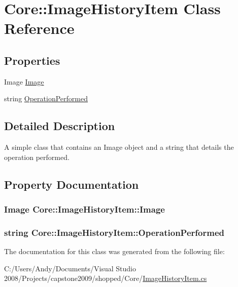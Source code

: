 \hypertarget{class_core_1_1_image_history_item}{
\section{Core::ImageHistoryItem Class Reference}
\label{class_core_1_1_image_history_item}
}
\subsection*{Properties}
\begin{DoxyCompactItemize}
\item 
Image \hyperlink{class_core_1_1_image_history_item_af5221965c5ea168e8ce2b248783daa23}{Image}
\item 
string \hyperlink{class_core_1_1_image_history_item_aa0775d357dd30dafbc2de674b9bcba2b}{OperationPerformed}
\end{DoxyCompactItemize}


\subsection{Detailed Description}
A simple class that contains an Image object and a string that details the operation performed. 

\subsection{Property Documentation}
\hypertarget{class_core_1_1_image_history_item_af5221965c5ea168e8ce2b248783daa23}{
\subsubsection[{Image}]{\setlength{\rightskip}{0pt plus 5cm}Image Core::ImageHistoryItem::Image}}
\label{class_core_1_1_image_history_item_af5221965c5ea168e8ce2b248783daa23}
\hypertarget{class_core_1_1_image_history_item_aa0775d357dd30dafbc2de674b9bcba2b}{
\subsubsection[{OperationPerformed}]{\setlength{\rightskip}{0pt plus 5cm}string Core::ImageHistoryItem::OperationPerformed}}
\label{class_core_1_1_image_history_item_aa0775d357dd30dafbc2de674b9bcba2b}


The documentation for this class was generated from the following file:\begin{DoxyCompactItemize}
\item 
C:/Users/Andy/Documents/Visual Studio 2008/Projects/capstone2009/shopped/Core/\hyperlink{_image_history_item_8cs}{ImageHistoryItem.cs}\end{DoxyCompactItemize}
